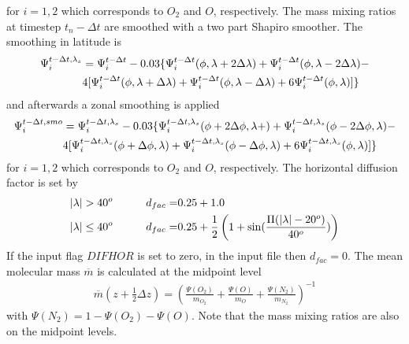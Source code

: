 %
for $i = 1, 2$ which corresponds to $O_2$ and $O$, respectively. The
mass mixing ratios at timestep $t_n - \Delta t$ are smoothed with a
two part Shapiro smoother. The smoothing in latitude is
%
\begin{align}
  \Psi_i^{t-\Delta t, \lambda_s}& = \Psi_i^{t-\Delta t} - 0.03 \{\Psi_i^{t-\Delta t}(\phi,\lambda +
  2 \Delta \lambda) + \Psi_i^{t-\Delta t}(\phi,\lambda -
  2 \Delta \lambda) - \notag \\
  & 4 [\Psi_i^{t-\Delta t}(\phi,\lambda +
   \Delta \lambda)+ \Psi_i^{t-\Delta t}(\phi,\lambda - \Delta \lambda)+
   6\Psi_i^{t-\Delta t}(\phi,\lambda)]\}
\end{align}
%
and afterwards a zonal smoothing is applied
%
\begin{align}
  \Psi_i^{t-\Delta t, smo}& = \Psi_i^{t-\Delta t, \lambda_s} - 0.03
  \{\Psi_i^{t-\Delta t, \lambda_s}(\phi+ 2\Delta \phi,\lambda +
  ) + \Psi_i^{t-\Delta t, \lambda_s}(\phi- 2\Delta \phi,\lambda ) - \notag \\
  & 4 [\Psi_i^{t-\Delta t, \lambda_s}(\phi+ \Delta \phi,\lambda )+
  \Psi_i^{t-\Delta t, \lambda_s}(\phi-\Delta \phi,\lambda )+
   6\Psi_i^{t-\Delta t, \lambda_s}(\phi,\lambda)]\}
\end{align}
%
for $i = 1, 2$ which corresponds to $O_2$ and $O$, respectively. The
horizontal diffusion factor is set by
%
\begin{align}
  |\lambda| & > 40^o    & \qquad d_{fac} = & 0.25 + 1.0 \notag \\
  |\lambda| & \leq 40^o & \qquad d_{fac} = & 0.25 + \frac{1}{2}
        \left( 1+\sin(\frac{\Pi (|\lambda| - 20^o)}{40^o})\right)
\end{align}
%
If the input flag $DIFHOR$ is set to zero, in the input file then
$d_{fac} = 0$. The mean molecular mass $\overline{m}$ is calculated
at the midpoint level
%
\begin{align}
 \overline{m} (z+\frac{1}{2}\Delta z) = \left( \frac{\Psi(O_2)}{m_{O_2}} +
    \frac{\Psi(O)}{m_{O}}+ \frac{\Psi(N_2)}{m_{N_2}} \right)^{-1}
\end{align}
%
with $\Psi(N_2) = 1 - \Psi(O_2) - \Psi(O)$. Note that the mass
mixing ratios are also on the midpoint levels. \\

